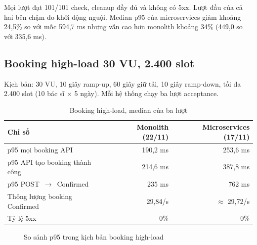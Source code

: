 Mọi lượt đạt 101/101 check, cleanup đầy đủ và không có 5xx. Lượt đầu của cả hai bên chậm do khởi động nguội. Median p95 của microservices giảm khoảng 24,5\% so với mốc 594,7 ms nhưng vẫn cao hơn monolith khoảng 34\% (449,0 so với 335,6 ms).

\subsection{Booking high-load 30 VU, 2.400 slot}

Kịch bản: 30 VU, 10 giây ramp-up, 60 giây giữ tải, 10 giây ramp-down, tối đa 2.400 slot (10 bác sĩ $\times$ 5 ngày). Mỗi hệ thống chạy ba lượt acceptance.

\begin{table}[!t]
\centering
\caption{Booking high-load, median của ba lượt}
\label{tab:highload}
\small
\begin{tabularx}{\linewidth}{@{}L{3.1cm}RR@{}}
\toprule
\textbf{Chỉ số} & \textbf{Monolith (22/11)} & \textbf{Microservices (17/11)} \\
\midrule
p95 mọi booking API & 190,2 ms & 253,6 ms \\
p95 API tạo booking thành công & 214,6 ms & 387,8 ms \\
p95 POST~$\rightarrow$~Confirmed & 235 ms & 762 ms \\
Thông lượng booking Confirmed & 29,84/s & $\approx$ 29,72/s \\
Tỷ lệ 5xx & 0\% & 0\% \\
\bottomrule
\end{tabularx}
\end{table}

\begin{figure}[!t]
\centering
{}
\caption{So sánh p95 trong kịch bản booking high-load}
\label{fig:highload}
\end{figure}

